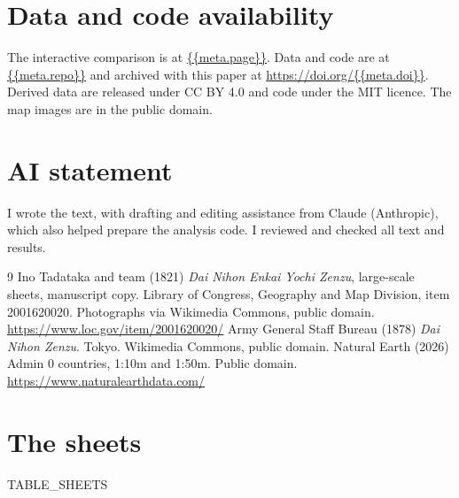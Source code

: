\documentclass[11pt,a4paper]{article}
\begin{document}
\section*{Data and code availability}
The interactive comparison is at \url{{{meta.page}}}. Data and code are at \url{{{meta.repo}}} and archived with this paper at \url{https://doi.org/{{meta.doi}}}. Derived data are released under CC BY 4.0 and code under the MIT licence. The map images are in the public domain.

\section*{AI statement}
I wrote the text, with drafting and editing assistance from Claude (Anthropic), which also helped prepare the analysis code. I reviewed and checked all text and results.

\begin{thebibliography}{9}
 Ino Tadataka and team (1821) \textit{Dai Nihon Enkai Yochi Zenzu}, large-scale sheets, manuscript copy. Library of Congress, Geography and Map Division, item 2001620020. Photographs via Wikimedia Commons, public domain. \url{https://www.loc.gov/item/2001620020/}
 Army General Staff Bureau (1878) \textit{Dai Nihon Zenzu}. Tokyo. Wikimedia Commons, public domain.
 Natural Earth (2026) Admin 0 countries, 1:10m and 1:50m. Public domain. \url{https://www.naturalearthdata.com/}
\end{thebibliography}

\clearpage
\appendix
\section{The sheets}
{{TABLE_SHEETS}}
\end{document}
